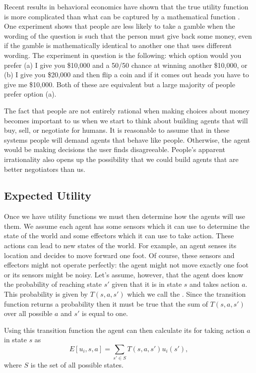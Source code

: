 Recent results in behavioral economics have shown that the true
utility function is more complicated than what can be captured by a
mathematical function \cite{camerer03a}. One experiment shows that
people are less likely to take a gamble when the wording of the
question is such that the person must give back some money, even if
the gamble is mathematically identical to another one that uses
different wording. The experiment in question is the following: which
option would you prefer (a) I give you \$10,000 and a 50/50 chance at
winning another \$10,000, or (b) I give you \$20,000 and then flip a
coin and if it comes out heads you have to give me \$10,000. Both of
these are equivalent but a large majority of people prefer option (a).

The fact that people are not entirely rational when making choices
about money becomes important to us when we start to think about
building agents that will buy, sell, or negotiate for humans. It is
reasonable to assume that in these systems people will demand agents
that behave like people. Otherwise, the agent would be making
decisions the user finds disagreeable. People's apparent irrationality
also opens up the possibility that we could build agents that are
better negotiators than us.

\subsection{Expected Utility}
\label{sec:expected-utility}

Once we have utility functions we must then determine how the agents
will use them. We assume each agent has some sensors which it can use
to determine the state of the world and some effectors which it can
use to take action.  These actions can lead to new states of the
world. For example, an agent senses its location and decides to move
forward one foot. Of course, these sensors and effectors might not
operate perfectly: the agent might not move exactly one foot or its
sensors might be noisy. Let's assume, however, that the agent does
know the probability of reaching state $s'$ given that it is in state
$s$ and takes action $a$. This probability is given by $T(s,a,s')$
which we call the . Since the transition
function returns a probability then it must be true that the sum of
$T(s,a,s')$ over all possible $a$ and $s'$ is equal to one.

Using this transition function the agent can then calculate its
 for taking action $a$ in state $s$ as
\begin{equation}
  \label{eq:mod-eu}
  E[u_i,s,a] = \sum_{s' \in S} T(s,a,s')u_i(s'),
\end{equation}
where $S$ is the set of all possible states. 

